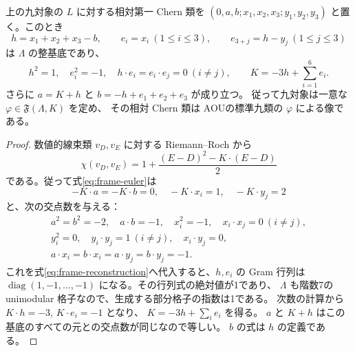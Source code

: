 \begin{lemma}\label{lem:weyl-frame-reconstruction}
上の九対象の $L$ に対する相対第一 Chern 類を
$(0,a,b;x_1,x_2,x_3;y_1,y_2,y_3)$ と置く。このとき
\begin{equation}\label{eq:frame-reconstruction}
 h=x_1+x_2+x_3-b,\qquad
 e_i=x_i\ (1\le i\le3),\qquad e_{3+j}=h-y_j\ (1\le j\le3)
\end{equation}
は $\Lambda$ の整基底であり、
\[
 h^2=1,\quad e_i^2=-1,\quad h\cdot e_i=e_i\cdot e_j=0\ (i\ne j),
 \qquad K=-3h+\sum_{i=1}^6e_i.
\]
さらに $a=K+h$ と $b=-h+e_1+e_2+e_3$ が成り立つ。
従って九対象は一意な $\varphi\in\mathfrak F(\Lambda,K)$ を定め、
その相対 Chern 類は AOU\cite[(4.1), (9.44)]{AOU}の標準九類の $\varphi$ による像である。
\end{lemma}
\begin{proof}
数値的線束類 $v_D,v_E$ に対する Riemann--Roch から
\[
 \chi(v_D,v_E)=1+\frac{(E-D)^2-K\cdot(E-D)}2
\]
である。従って式\eqref{eq:frame-euler}は
\[
 -K\cdot a=-K\cdot b=0,\quad -K\cdot x_i=1,\quad -K\cdot y_j=2
\]
と、次の交点数を与える：
\[
 \begin{gathered}
 a^2=b^2=-2,\quad a\cdot b=-1,\quad
 x_i^2=-1,\quad x_i\cdot x_j=0\ (i\ne j),\\
 y_i^2=0,\quad y_i\cdot y_j=1\ (i\ne j),\quad
 x_i\cdot y_j=0,\\
 a\cdot x_i=b\cdot x_i=a\cdot y_j=b\cdot y_j=-1.
 \end{gathered}
\]
これを式\eqref{eq:frame-reconstruction}へ代入すると、$h,e_i$ の Gram 行列は
$\operatorname{diag}(1,-1,\ldots,-1)$ になる。その行列式の絶対値が1であり、
$\Lambda$ も階数7の unimodular 格子なので、生成する部分格子の指数は1である。
次数の計算から $K\cdot h=-3$, $K\cdot e_i=-1$ となり、
$K=-3h+\sum_i e_i$ を得る。
$a$ と $K+h$ はこの基底のすべての元との交点数が同じなので等しい。
$b$ の式は $h$ の定義である。
\end{proof}

